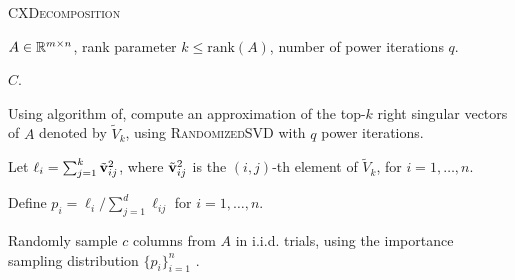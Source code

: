 \begin{algorithm}[tb]
 \caption{\textsc{CXDecomposition}}
  \label{alg:cx}
  \begin{algorithmic}[1]
    \Require $A \in \mathbb{R}^{m\times n}$, rank parameter $k \leq \textrm{rank}(A)$, number of power iterations $q$.

    \Ensure $C$.
    

    \State Using algorithm of\cite{DMMW12_JMLR}, compute an approximation of the top-$k$ right singular vectors of $A$ denoted by $\tilde V_k$, using \textsc{RandomizedSVD} with $q$ power iterations.
    
    \State Let $\ell_i = \sum_{j=1}^k \tilde {\mathbf{v}}_{ij}^2$, where $\tilde {\mathbf{v}}_{ij}^2$ is the $(i,j)$-th element of $\tilde V_k$, for $i = 1, \ldots, n$. 
    
    \State Define $p_i = \ell_i / \sum_{j=1}^d \ell_{ij}$ for $i=1,\ldots,n$.
    
    \State Randomly sample $c$ columns from $A$ in i.i.d. trials, using the importance sampling distribution $\{p_i\}_{i=1}^n$ .

    

    \end{algorithmic}
\end{algorithm}


